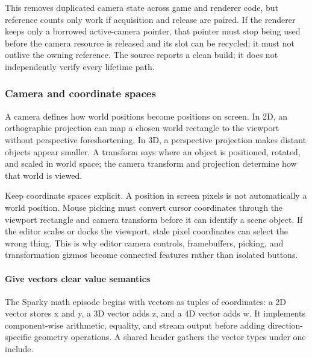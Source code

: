 This removes duplicated camera state across game and renderer code, but reference counts only work if acquisition and release are paired. If the renderer keeps only a borrowed active-camera pointer, that pointer must stop being used before the camera resource is released and its slot can be recycled; it must not outlive the owning reference. The source reports a clean build; it does not independently verify every lifetime path.

\subsubsection{Camera and coordinate spaces}\label{06-engine-ii-ch025-camera-and-coordinate-spaces}

\hypertarget{06-engine-ii-ch025-camera-and-coordinate-spaces}{}

A camera defines how world positions become positions on screen. In 2D, an orthographic projection can map a chosen world rectangle to the viewport without perspective foreshortening. In 3D, a perspective projection makes distant objects appear smaller. A transform says where an object is positioned, rotated, and scaled in world space; the camera transform and projection determine how that world is viewed.

Keep coordinate spaces explicit. A position in screen pixels is not automatically a world position. Mouse picking must convert cursor coordinates through the viewport rectangle and camera transform before it can identify a scene object. If the editor scales or docks the viewport, stale pixel coordinates can select the wrong thing. This is why editor camera controls, framebuffers, picking, and transformation gizmos become connected features rather than isolated buttons.

\paragraph{Give vectors clear value semantics}\label{06-engine-ii-ch025-give-vectors-clear-value-semantics}

\hypertarget{06-engine-ii-ch025-give-vectors-clear-value-semantics}{}

The Sparky math episode begins with vectors as tuples of coordinates: a 2D vector stores x and y, a 3D vector adds z, and a 4D vector adds w. It implements component-wise arithmetic, equality, and stream output before adding direction-specific geometry operations. A shared header gathers the vector types under one include.

